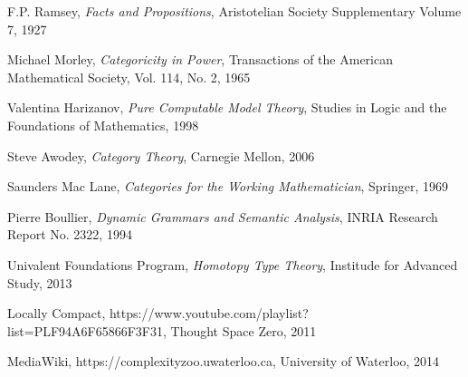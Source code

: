 \documentclass{article}
\begin{document}
\begin{thebibliography}{99}
    F.P. Ramsey,
    \emph{Facts and Propositions},
    Aristotelian Society Supplementary Volume 7,
    1927

    Michael Morley,
    \emph{Categoricity in Power},
    Transactions of the American Mathematical Society, Vol. 114, No. 2,
    1965

    Valentina Harizanov,
    \emph{Pure Computable Model Theory},
    Studies in Logic and the Foundations of Mathematics,
    1998

    Steve Awodey,
    \emph{Category Theory},
    Carnegie Mellon,
    2006

    Saunders Mac Lane,
    \emph{Categories for the Working Mathematician},
    Springer,
    1969

    Pierre Boullier,
    \emph{Dynamic Grammars and Semantic Analysis},
    INRIA Research Report No. 2322,
    1994

    Univalent Foundations Program,
    \emph{Homotopy Type Theory},
    Institude for Advanced Study,
    2013

    Locally Compact,
    https://www.youtube.com/playlist?list=PLF94A6F65866F3F31,
    Thought Space Zero,
    2011

    MediaWiki,
    https://complexityzoo.uwaterloo.ca,
    University of Waterloo,
    2014

\end{thebibliography}

\end{document}
